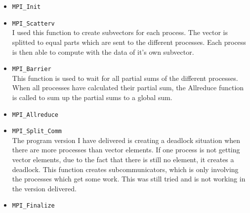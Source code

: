 \documentclass{article}
\begin{document}
\begin{itemize}
\item \texttt{MPI\_Init}
\item \texttt{MPI\_Scatterv}\\
I used this function to create subvectors for each process. The vector is splitted to equal parts which are sent to the different processes. Each process is then able to compute with the data of it's own subvector.
\item \texttt{MPI\_Barrier}\\
This function is used to wait for all partial sums of the different processes. When all processes have calculated their partial sum, the Allreduce function is called to sum up the partial sums to a global sum.
\item \texttt{MPI\_Allreduce}
\item \texttt{MPI\_Split\_Comm}\\
The program version I have delivered is creating a deadlock situation when there are more processes than vector elements. If one process is not getting vector elements, due to the fact that there is still no element, it creates a deadlock. This function creates subcommunicators, which is only involving the processes which get some work. This was still tried and is not working in the version delivered.
\item \texttt{MPI\_Finalize}
\end{itemize}
\end{document}
